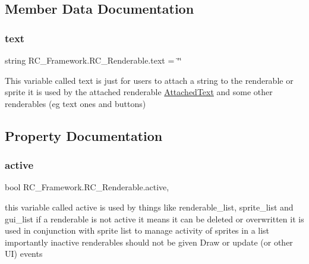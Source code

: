 \subsection{Member Data Documentation}
\mbox{\label{class_r_c___framework_1_1_r_c___renderable_a255c5d9294a719e56855890f3535d129}} 
\subsubsection{\texorpdfstring{text}{text}}
{\footnotesize\ttfamily string R\+C\+\_\+\+Framework.\+R\+C\+\_\+\+Renderable.\+text = \char`\"{}\char`\"{}}



This variable called text is just for users to attach a string to the renderable or sprite it is used by the attached renderable \mbox{\hyperlink{class_r_c___framework_1_1_attached_text}{Attached\+Text}} and some other renderables (eg text ones and buttons) 



\subsection{Property Documentation}
\mbox{\label{class_r_c___framework_1_1_r_c___renderable_a192f8ec61fb5e94770fcb3a1f9ae3449}} 
\subsubsection{\texorpdfstring{active}{active}}
{\footnotesize\ttfamily bool R\+C\+\_\+\+Framework.\+R\+C\+\_\+\+Renderable.\+active\hspace{0.3cm}{\ttfamily [get]}, {\ttfamily [set]}}



this variable called active is used by things like renderable\+\_\+list, sprite\+\_\+list and gui\+\_\+list if a renderable is not active it means it can be deleted or overwritten it is used in conjunction with sprite list to manage activity of sprites in a list importantly inactive renderables should not be given Draw or update (or other UI) events 

